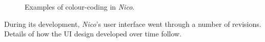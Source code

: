 \documentclass[12pt,twoside,notitlepage,xetex]{report}
\begin{document}
\begin{center}
\begin{figure}[H]
\begin{center}
{}\hspace{2cm}
\end{center}
\caption{Examples of colour-coding in \emph{Nico}.}
\end{figure}
\end{center}

During its development, \emph{Nico}'s user interface went through a number of
revisions.  Details of how the UI design developed over time follow.
\end{document}
